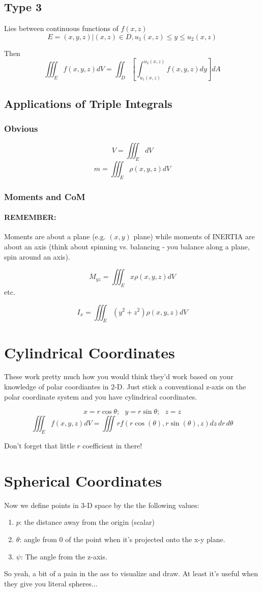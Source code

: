 \documentclass[a4paper,12pt]{report}
\begin{document}
\subsection{Type 3}
Lies between continuous functions of $f(x, z)$
$$E = {(x, y, z) | (x, z) \in D, u_1(x, z) \leq y \leq u_2(x, z) }$$

Then $$\iiint_E f(x, y, z) dV = \iint_D [\int_{u_1(x, z)}^{u_2(x, z)} f(x, y, z) dy] dA$$


\subsection{Applications of Triple Integrals}
\subsubsection{Obvious}
$$V = \iiint_E dV$$
$$m = \iiint_E \rho(x, y, z) dV$$

\subsubsection{Moments and CoM}
\paragraph{REMEMBER: } Moments are about a plane (e.g. $(x, y)$ plane) while moments of INERTIA are 
about an axis (think about spinning vs. balancing - you balance along a plane, spin around an axis).

$$M_{yz} = \iiint_E x\rho(x, y, z) dV$$
etc.

$$I_x = \iiint_E (y^2 + z^2) \rho(x,y,z)dV$$

\section{Cylindrical Coordinates}
These work pretty much how you would think they'd work based on your knowledge of polar coordiantes in 2-D. Just stick a
conventional z-axis on the polar coordinate system and you have cylindrical coordinates.

$$x = r\cos\theta; \,\,\,\, y = r\sin\theta; \,\,\,\, z = z$$
$$\iiint_E f(x, y, z) dV = \iiint r f(r\cos(\theta), r\sin(\theta), z) dz\,dr\,d\theta$$

Don't forget that little $r$ coefficient in there! 

\section{Spherical Coordinates}
Now we define points in 3-D space by the the following values: 
\begin{enumerate}
\item $p$: the distance away from the origin (scalar)
\item $\theta$: angle from 0 of the point when it's projected onto the x-y plane.
\item $\psi$: The angle from the z-axis.
\end{enumerate}
So yeah, a bit of a pain in the ass to visualize and draw. At least it's useful when they give you literal spheres... 
\end{document}
